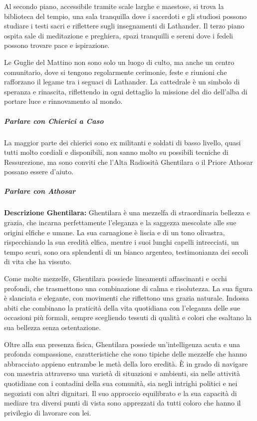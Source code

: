 \documentclass{article}
\begin{document}
            Al secondo piano, accessibile tramite scale larghe e maestose, si trova la biblioteca del tempio, una sala tranquilla dove i sacerdoti e gli studiosi possono studiare i testi sacri e riflettere sugli insegnamenti di Lathander. Il terzo piano ospita sale di meditazione e preghiera, spazi tranquilli e sereni dove i fedeli possono trovare pace e ispirazione.
            
            Le Guglie del Mattino non sono solo un luogo di culto, ma anche un centro comunitario, dove si tengono regolarmente cerimonie, feste e riunioni che rafforzano il legame tra i seguaci di Lathander. La cattedrale è un simbolo di speranza e rinascita, riflettendo in ogni dettaglio la missione del dio dell'alba di portare luce e rinnovamento al mondo.
            
            \subparagraph{Parlare con Chierici a Caso} La maggior parte dei chierici sono ex militanti e soldati di basso livello, quasi tutti molto cordiali e disponibili, non sanno molto su possibili tecniche di Ressurezione, ma sono conviti che l'Alta Radiosità Ghentilara o il Priore Athosar possano essere d'aiuto. 

            \subparagraph{Parlare con Athosar} 
            \textbf{Descrizione Ghentilara: } Ghentilara è una mezzelfa di straordinaria bellezza e grazia, che incarna perfettamente l'eleganza e la saggezza mescolate alle sue origini elfiche e umane. La sua carnagione è liscia e di un tono olivastra, rispecchiando la sua eredità elfica, mentre i suoi lunghi capelli intrecciati, un tempo scuri, sono ora splendenti di un bianco argenteo, testimonianza dei secoli di vita che ha vissuto.

            Come molte mezzelfe, Ghentilara possiede lineamenti affascinanti e occhi profondi, che trasmettono una combinazione di calma e risolutezza. La sua figura è slanciata e elegante, con movimenti che riflettono una grazia naturale. Indossa abiti che combinano la praticità della vita quotidiana con l'eleganza delle sue occasioni più formali, sempre scegliendo tessuti di qualità e colori che esaltano la sua bellezza senza ostentazione.
            
            Oltre alla sua presenza fisica, Ghentilara possiede un'intelligenza acuta e una profonda compassione, caratteristiche che sono tipiche delle mezzelfe che hanno abbracciato appieno entrambe le metà della loro eredità. È in grado di navigare con maestria attraverso una varietà di situazioni e ambienti, sia nelle attività quotidiane con i contadini della sua comunità, sia negli intrighi politici e nei negoziati con altri dignitari. Il suo approccio equilibrato e la sua capacità di mediare tra diversi punti di vista sono apprezzati da tutti coloro che hanno il privilegio di lavorare con lei.
            
\end{document}
